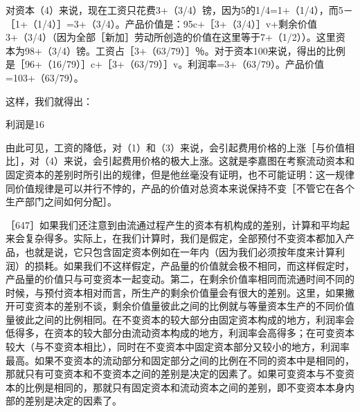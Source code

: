 对资本（4）来说，现在工资只花费3+（3/4）镑，因为5的1/4=1+（1/4），而5－［1+（1/4）］=3+（3/4）。产品价值是：95c+［3+（3/4）］v+剩余价值3+（3/4）（因为全部［新加］劳动所创造的价值在这里等于7+（1/2））。这里资本为98+（3/4）镑。工资占［3+（63/79）］％。对于资本100来说，得出的比例是［96+（16/79）］c+［3+（63/79）］v。利润率=3+（63/79）。产品价值=103+（63/79）。

这样，我们就得出：

\todo{}

利润是16%

由此可见，工资的降低，对（1）和（3）来说，会引起费用价格的上涨［与价值相比］，对（4）来说，会引起费用价格的极大上涨。这就是李嘉图在考察流动资本和固定资本的差别时所引出的规律，但是他丝毫没有证明，也不可能证明：这一规律同价值规律是可以并行不悖的，产品的价值对总资本来说保持不变［不管它在各个生产部门之间如何分配］。

［647］如果我们还注意到由流通过程产生的资本有机构成的差别，计算和平均起来会复杂得多。实际上，在我们计算时，我们是假定，全部预付不变资本都加入产品，也就是说，它只包含固定资本例如在一年内（因为我们必须按年度来计算利润）的损耗。如果我们不这样假定，产品量的价值就会极不相同，而这样假定时，产品量的价值只与可变资本一起变动。第二，在剩余价值率相同而流通时间不同的时候，与预付资本相对而言，所生产的剩余价值量会有很大的差别。这里，如果撇开可变资本的差别不谈，剩余价值量彼此之间的比例就与等量资本生产的不同价值量彼此之间的比例相同。在不变资本的较大部分由固定资本构成的地方，利润率会低得多，在资本的较大部分由流动资本构成的地方，利润率会高得多；在可变资本较大（与不变资本相比），同时在不变资本中固定资本部分又较小的地方，利润率最高。如果不变资本的流动部分和固定部分之间的比例在不同的资本中是相同的，那就只有可变资本和不变资本之间的差别是决定的因素了。如果可变资本与不变资本的比例是相同的，那就只有固定资本和流动资本之间的差别，即不变资本本身内部的差别是决定的因素了。

